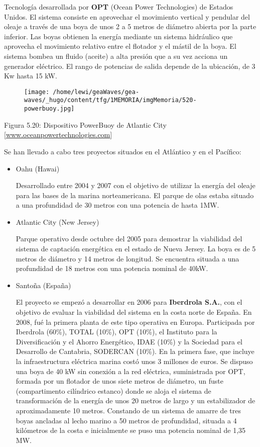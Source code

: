 \begin{itemize}
  Tecnología desarrollada por \textbf{OPT} (Ocean Power Technologies) de
  Estados Unidos. El sistema consiste en aprovechar el movimiento
  vertical y pendular del oleaje a través de una boya de unos 2 a 5
  metros de diámetro abierta por la parte inferior. Las boyas obtienen
  la energía mediante un sistema hidráulico que aprovecha el movimiento
  relativo entre el flotador y el mástil de la boya. El sistema bombea
  un fluido (aceite) a alta presión que a su vez acciona un generador
  eléctrico. El rango de potencias de salida depende de la ubicación, de
  3 Kw hasta 15 kW.

  \begin{figure}
  \centering
  \texttt{[image: /home/lewi/geaWaves/gea-waves/\_hugo/content/tfg/1MEMORIA/imgMemoria/520-powerbuoy.jpg]}
  \caption{}
  \end{figure}

  Figura 5.20: Dispositivo PowerBuoy de Atlantic City
  {[}\url{www.oceanpowertechnologies.com}{]}

  Se han llevado a cabo tres proyectos situados en el Atlántico y en el
  Pacífico:

  \begin{itemize}
  \item
    Oahu (Hawai)

    Desarrollado entre 2004 y 2007 con el objetivo de utilizar la
    energía del oleaje para las bases de la marina norteamericana. El
    parque de olas estaba situado a una profundidad de 30 metros con una
    potencia de hasta 1MW. 
  \item
    Atlantic City (New Jersey)

    Parque operativo desde octubre del 2005 para demostrar la viabilidad
    del sistema de captación energética en el estado de Nueva Jersey. La
    boya es de 5 metros de diámetro y 14 metros de longitud. Se
    encuentra situada a una profundidad de 18 metros con una potencia
    nominal de 40kW.
  \item
    Santoña (España)

    El proyecto se empezó a desarrollar en 2006 para \textbf{Iberdrola
    S.A.}, con el objetivo de evaluar la viabilidad del sistema en la
    costa norte de España. En 2008, fué la primera planta de este tipo
    operativa en Europa. Participada por Iberdrola (60\%), TOTAL (10\%),
    OPT (10\%), el Instituto para la Diversificación y el Ahorro
    Energético, IDAE (10\%) y la Sociedad para el Desarrollo de
    Cantabria, SODERCAN (10\%). En la primera fase, que incluye la
    infraestructura eléctrica marina costó unos 3 millones de euros. Se
    dispuso una boya de 40 kW sin conexión a la red eléctrica,
    suministrada por OPT, formada por un flotador de unos siete metros
    de diámetro, un fuste (compartimento cilíndrico estanco) donde se
    aloja el sistema de transformación de la energía de unos 20 metros
    de largo y un estabilizador de aproximadamente 10 metros. Constando
    de un sistema de amarre de tres boyas ancladas al lecho marino a 50
    metros de profundidad, situada a 4 kilómetros de la costa e
    inicialmente se puso una potencia nominal de 1,35 MW.


\end{itemize}
\end{itemize}
